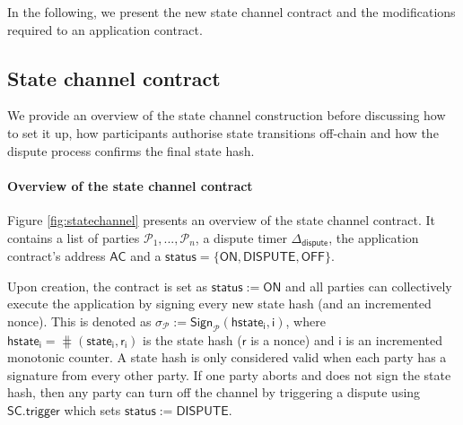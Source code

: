 \documentclass{llncs}
\newcommand{\chanstatus}{\mathsf{status}}
\newcommand{\chanon}{\mathsf{ON}}
\newcommand{\chandispute}{\mathsf{DISPUTE}}
\newcommand{\chanoff}{\mathsf{OFF}}
\newcommand{\hstatei}{\mathsf{hstate}_{\monotoniccounter}}
\newcommand{\monotoniccounter}{\mathsf{i}}
\newcommand{\stateinfoi}{\mathsf{state}_{\mathsf{i}}}
\newcommand{\participant}{\mathcal{P}}
\newcommand{\rani}{\mathsf{r}_{\mathsf{i}}}
\newcommand{\ran}{\mathsf{r}}
\newcommand{\statechanneldispute}{\mathsf{SC}.\mathsf{trigger}}
\newcommand{\sign}{\mathsf{Sign}}
\newcommand{\appcontract}{\mathsf{AC}}
\newcommand{\timerdispute}{\mathsf{\Delta}_{\mathsf{dispute}}}
\begin{document}
In the following, we present the new state channel contract and the modifications required to an application contract. 


\subsection{State channel contract}


We provide an overview of the state channel construction before discussing how to set it up, how participants authorise state transitions off-chain and how the dispute process confirms the final state hash. 

\paragraph{Overview of the state channel contract} 
Figure \ref{fig:statechannel} presents an overview of the state channel contract. 
It contains a list of parties $\participant_{1},...,\participant_{n}$, a dispute timer $\timerdispute$, the application contract's address $\appcontract$ and a  $\chanstatus = \{\chanon, \chandispute, \chanoff\}.$

Upon creation, the contract is set as $\chanstatus := \chanon$ and all parties can collectively execute the application by signing every new state hash (and an incremented nonce).
This is denoted as $\sigma_{\participant} := \sign_{\participant}(\hstatei, \monotoniccounter)$, where  $\hstatei = \hash(\stateinfoi, \rani)$ is the state hash ($\ran$ is a nonce) and $\monotoniccounter$ is an incremented monotonic counter. 
A state hash is only considered valid when each party has a signature from every other party. 
If one party aborts and does not sign the state hash, then any party can turn off the channel by triggering a dispute using $\statechanneldispute$ which sets $\chanstatus := \chandispute$. 
\end{document}
